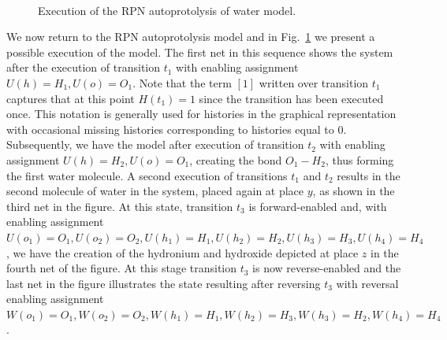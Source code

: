 \documentclass[runningheads]{llncs}
\begin{document}
\begin{figure}
	\\\vspace{-0.25cm}
	\caption{Execution of the RPN autoprotolysis of water model.}
	\label{execution}
\end{figure}

We now return to the RPN autoprotolysis model and in Fig.~\ref{execution} we present
a possible execution of the model. The first net in this sequence shows the system after 
the execution of transition $t_1$ with enabling assignment $U(h)=H_1, U(o)=O_1$. Note
that the term $[1]$ written over transition $t_1$ captures that at this point $H(t_1)=1$ 
since the transition has been executed once.
This notation is generally used for histories in the graphical representation with occasional
missing histories corresponding to histories equal to $0$.
Subsequently,
we have the model after execution of transition $t_2$ with enabling assignment $U(h)=H_2,
U(o)=O_1$, creating the bond $O_1-H_2$, thus forming the first water molecule. A second
execution of transitions $t_1$ and $t_2$ results in the second molecule of water in the system,
placed again at place $y$, as shown in the third net in the figure. At this state, transition
$t_3$ is forward-enabled and,  with enabling assignment $U(o_1)=O_1, U(o_2)=O_2, U(h_1)=H_1, 
U(h_2)=H_2,U(h_3)=H_3,U(h_4)=H_4$, we have the creation of the hydronium and hydroxide
depicted at place $z$ in the fourth net of the figure. At this stage  transition $t_3$ is
now reverse-enabled and the last net in the figure illustrates the state resulting after
reversing $t_3$ with reversal enabling assignment $W(o_1)=O_1, W(o_2)=O_2, W(h_1)=H_1, 
W(h_2)=H_3,W(h_3)=H_2,W(h_4)=H_4$.
\end{document}
